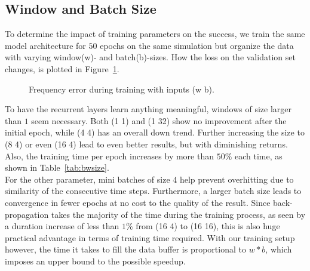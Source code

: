 \documentclass[sigconf]{acmart}
\begin{document}
\subsection{Window and Batch Size}
To determine the impact of training parameters on the success, we train the same model architecture for $50$ epochs on the same simulation but organize the data with varying window(w)- and batch(b)-sizes. How the loss on the validation set changes, is plotted in Figure~\ref{bwsize}.
\begin{figure}
	\caption{Frequency error during training with inputs (w b).}
	\label{bwsize}
\end{figure}
To have the recurrent layers learn anything meaningful, windows of size larger than $1$ seem necessary. Both (1 1) and (1 32) show no improvement after the initial epoch, while (4 4) has an overall down trend. Further increasing the size to (8 4) or even (16 4) lead to even better results, but with diminishing returns. Also, the training time per epoch increases by more than $50\%$ each time, as shown in Table~\ref{tab:bwsize}.\\
For the other parameter, mini batches of size $4$ help prevent overhitting due to similarity of the consecutive time steps. Furthermore, a larger batch size leads to convergence in fewer epochs at no cost to the quality of the result. Since back-propagation takes the majority of the time during the training process, as seen by a duration increase of less than $1\%$ from (16 4) to (16 16), this is also huge practical advantage in terms of training time required. With our training setup however, the time it takes to fill the data buffer is proportional to $w*b$, which imposes an upper bound to the possible speedup.
\end{document}
